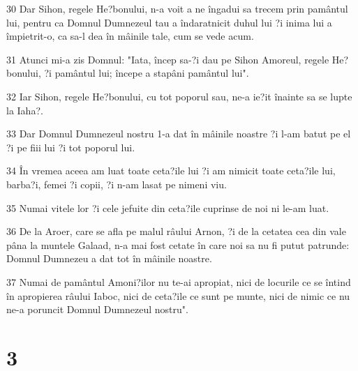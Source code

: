 \par 30 Dar Sihon, regele He?bonului, n-a voit a ne îngadui sa trecem prin pamântul lui, pentru ca Domnul Dumnezeul tau a îndaratnicit duhul lui ?i inima lui a împietrit-o, ca sa-l dea în mâinile tale, cum se vede acum.
\par 31 Atunci mi-a zis Domnul: "Iata, încep sa-?i dau pe Sihon Amoreul, regele He?bonului, ?i pamântul lui; începe a stapâni pamântul lui".
\par 32 Iar Sihon, regele He?bonului, cu tot poporul sau, ne-a ie?it înainte sa se lupte la Iaha?.
\par 33 Dar Domnul Dumnezeul nostru 1-a dat în mâinile noastre ?i l-am batut pe el ?i pe fiii lui ?i tot poporul lui.
\par 34 În vremea aceea am luat toate ceta?ile lui ?i am nimicit toate ceta?ile lui, barba?i, femei ?i copii, ?i n-am lasat pe nimeni viu.
\par 35 Numai vitele lor ?i cele jefuite din ceta?ile cuprinse de noi ni le-am luat.
\par 36 De la Aroer, care se afla pe malul râului Arnon, ?i de la cetatea cea din vale pâna la muntele Galaad, n-a mai fost cetate în care noi sa nu fi putut patrunde: Domnul Dumnezeu a dat tot în mâinile noastre.
\par 37 Numai de pamântul Amoni?ilor nu te-ai apropiat, nici de locurile ce se întind în apropierea râului Iaboc, nici de ceta?ile ce sunt pe munte, nici de nimic ce nu ne-a poruncit Domnul Dumnezeul nostru".

\chapter{3}

